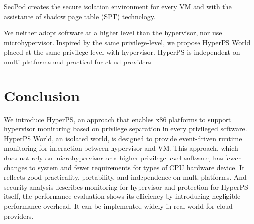 \documentclass[conference]{IEEEtran}
\begin{document}
SecPod\cite{Wang2015SecPod} creates the secure isolation environment for every VM and with the assistance of shadow page table (SPT) technology.


We neither adopt software at a higher level than the hypervisor, nor use microhypervisor. Inspired by the same privilege-level, we propose HyperPS World placed at the same privilege-level with hypervisor. HyperPS is independent on multi-platforms and practical for cloud providers.

\section{Conclusion}\label{sec:conclusion}
We introduce HyperPS, an approach that enables x86 platforms to support hypervisor monitoring based on privilege separation in every privileged software. HyperPS World, an isolated world, is designed to provide event-driven runtime monitoring for interaction between hypervisor and VM. This approach, which does not rely on microhypervisor or a higher privilege level software, has fewer changes to system and fewer requirements for types of CPU hardware device. It reflects good practicality, portability, and independence on multi-platforms. And security analysis describes monitoring for hypervisor and protection for HyperPS itself, the performance evaluation shows its efficiency by introducing negligible performance overhead. It can be implemented widely in real-world for cloud providers.









 

\end{document}
